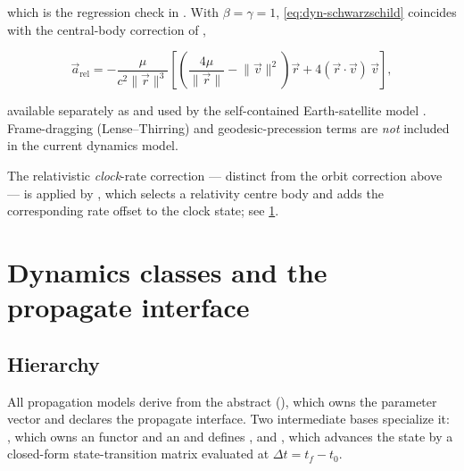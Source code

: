 which is the regression check in
. With $\beta=\gamma=1$,
\cref{eq:dyn-schwarzschild} coincides with the central-body correction of
\citet[Sec.~3.7.3]{montenbruck2000},

\begin{equation}
  \label{eq:dyn-mg-rel}
  \vec{a}_\mathrm{rel} =
  -\frac{\mu}{c^{2}\lVert\vec{r}\rVert^{3}}
  \left[\left(\frac{4\mu}{\lVert\vec{r}\rVert} - \lVert\vec{v}\rVert^{2}\right)\vec{r}
        + 4(\vec{r}\!\cdot\!\vec{v})\,\vec{v}\right],
\end{equation}

available separately as  and used by the
self-contained Earth-satellite model .
Frame-dragging (Lense--Thirring) and geodesic-precession terms are \emph{not}
included in the current dynamics model.

The relativistic \emph{clock}-rate correction --- distinct from the orbit
correction above --- is applied by , which selects a
relativity centre body and adds the corresponding rate offset to the clock state;
see \cref{sec:dyn-classes}.

\section{Dynamics classes and the propagate interface}
\label{sec:dyn-classes}

\subsection{Hierarchy}

All propagation models derive from the abstract 
(), which owns the parameter vector
 and declares the propagate interface. Two intermediate
bases specialize it: , which owns an  functor and
an  and defines , and
, which advances the state by a closed-form
state-transition matrix evaluated at $\Delta t = t_f - t_0$.

